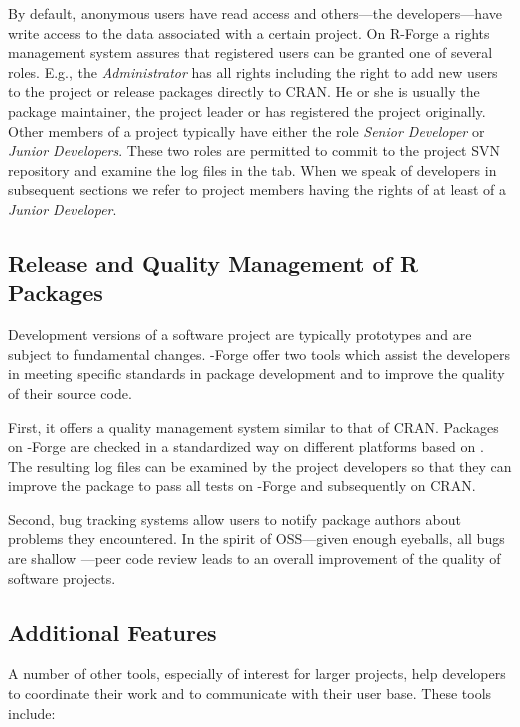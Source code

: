 By default, anonymous users have read access and others---the
developers---have write access to the data associated with 
a certain project. On R-Forge a rights management system assures that
registered users can be granted one of several roles. 
E.g., the \textit{Administrator} has all rights including the right to
add new users to the project or release packages directly to CRAN. He
or she is usually the package 
maintainer, the project leader or has registered the project originally.
Other members of a project typically have either the role \textit{Senior 
Developer} or \textit{Junior Developers}. These two roles are
permitted to commit to the project 
SVN repository and examine the log files in the  tab.
When we speak of developers in subsequent sections we refer to project
members having the rights of at least of a \textit{Junior Developer}.


\subsection{Release and Quality Management of R Packages}
\label{sec:release_and_quality_management}

Development versions of a software project are typically
prototypes and are subject to fundamental changes. \R{}-Forge offer
two tools which assist the developers in meeting specific standards in
\R{} package development and to improve the quality of their source
code. 

First, it offers a quality management system similar to 
that of CRAN. Packages on \R{}-Forge are checked in a
standardized way on different platforms based on
. The resulting log files can be examined by the
project developers so that they can improve
the package to pass all tests on \R{}-Forge and subsequently on CRAN.

Second, bug tracking systems allow users to notify
package authors about problems they encountered. In the spirit of
OSS---given enough eyeballs, all bugs are shallow
\citep{forge:Raymond:1999}---peer code review leads to an 
overall improvement of the quality of software projects.

\subsection{Additional Features}

A number of other tools, especially of interest for larger
projects, help developers to coordinate their work and to communicate
with their user base. These tools include:


